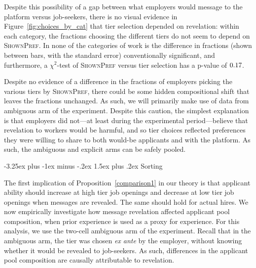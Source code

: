 \documentclass[12pt]{article}
\makeatletter
\renewcommand{\subsection}{%
  \@startsection{subsection}{2}{\z@}%
  {-3.25ex plus -1ex minus -.2ex}%
  {1.5ex plus .2ex}%
  {\normalfont\large\bfseries}%
}
\makeatother
\begin{document}
Despite this possibility of a gap between what employers would message to the platform versus job-seekers, there is no visual evidence in Figure~\ref{fig:choices_by_cat} that tier selection depended on revelation:
within each category, the fractions choosing the different tiers do not seem to depend on \textsc{ShownPref}.
In none of the categories of work is the difference in fractions (shown between bars, with the standard error) conventionally significant, and furthermore, a $\chi^2$-test of \textsc{ShownPref} versus tier selection has a p-value of $0.17{}$.

Despite no evidence of a difference in the fractions of employers picking the various tiers by \textsc{ShownPref}, there could be some hidden compositional shift that leaves the fractions unchanged.
As such, we will primarily make use of data from ambiguous arm of the experiment.  
Despite this caution, the simplest explanation is that employers did not---at least during the experimental period---believe that revelation to workers would be harmful, and so tier choices reflected preferences they were willing to share to both would-be applicants and with the platform.
As such, the ambiguous and explicit arms can be safely pooled. 

\subsection{Sorting} \label{sec:results_sorting} %

The first implication of Proposition~\ref{comparison1} in our theory is that applicant ability should increase at high tier job openings and decrease at low tier job openings when messages are revealed. The same should hold for actual hires. We now empirically investigate how message revelation affected applicant pool composition, when prior experience is used as a proxy for experience.
For this analysis, we use the two-cell ambiguous arm of the experiment.
Recall that in the ambiguous arm, the tier was chosen \emph{ex ante} by the employer, without knowing whether it would be revealed to job-seekers.
As such, differences in the applicant pool composition are causally attributable to revelation.
\end{document}
